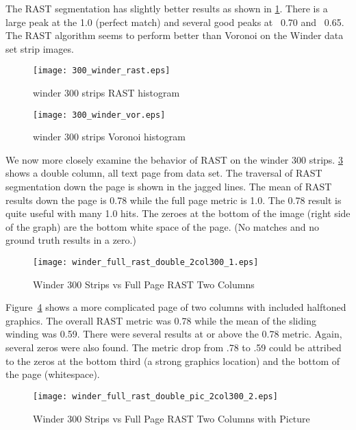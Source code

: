 \documentclass[conference]{IEEEtran}
\begin{document}
The RAST segmentation has slightly better results as shown in
\ref{fig:300-winder-rast}. There is a large peak at the 1.0 (perfect match) and
several good peaks at ~0.70 and ~0.65. The RAST algorithm seems to perform
better than Voronoi on the Winder data set strip images. 

\begin{figure}[300-winder-rast]
\texttt{[image: 300\_winder\_rast.eps]}
\caption{winder 300 strips RAST histogram}
\label{fig:300-winder-rast}
\end{figure}
\begin{figure}[300-winder-vor]
\texttt{[image: 300\_winder\_vor.eps]}
\caption{winder 300 strips Voronoi histogram}
\label{fig:300-winder-vor}
\end{figure}

We now more closely examine the behavior of RAST on the winder 300 strips.
\ref{fig:winder-300-double-2col300} shows a double column, all
text page from \cite{IEEEhowto:Winder} data set. The traversal of RAST
segmentation down the page is shown in the jagged lines. The mean of RAST
results down the page is 0.78 while the full page metric is 1.0.  The 0.78
result is quite useful with many 1.0 hits. The zeroes at the bottom of the
image (right side of the graph) are the bottom white space of the page. (No
matches and no ground truth results in a zero.)

\begin{figure}[winder-300-double-2col300]
\texttt{[image: winder\_full\_rast\_double\_2col300\_1.eps]}
\caption{Winder 300 Strips vs Full Page RAST Two Columns}
\label{fig:winder-300-double-2col300}
\end{figure}

Figure~\ref{fig:winder-300-double-pic-2col300} shows a more complicated page of
two columns with included halftoned graphics. The overall RAST metric was 0.78
while the mean of the sliding winding was 0.59. There were several results at
or above the 0.78 metric. Again, several zeros were also found. The metric drop
from .78 to .59 could be attribed to the zeros at the bottom third (a strong
graphics location) and the bottom of the page (whitespace).

\begin{figure}[winder-300-double-pic-2col300]
\texttt{[image: winder\_full\_rast\_double\_pic\_2col300\_2.eps]}
\caption{Winder 300 Strips vs Full Page RAST Two Columns with Picture}
\label{fig:winder-300-double-pic-2col300}
\end{figure}
\end{document}
